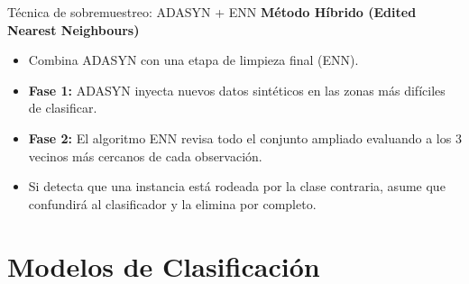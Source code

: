 \documentclass[10pt]{beamer}
\begin{document}
\begin{frame}{Técnica de sobremuestreo: ADASYN + ENN}
  \textbf{Método Híbrido (Edited Nearest Neighbours)}
  \begin{itemize}
    \item Combina ADASYN con una  etapa de limpieza  final (ENN).
    \item \textbf{Fase 1:} ADASYN inyecta nuevos datos sintéticos en las zonas más difíciles de clasificar.
    \item \textbf{Fase 2:} El algoritmo ENN revisa todo el conjunto ampliado evaluando a los 3 vecinos más cercanos de cada observación.
    \item Si detecta que una instancia está rodeada por la clase contraria, asume que confundirá al clasificador y la elimina por completo.
  \end{itemize}
\end{frame}

\section{Modelos de Clasificación}
\end{document}
